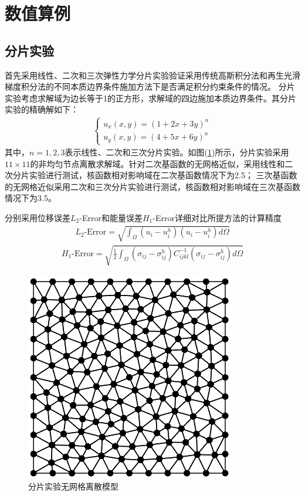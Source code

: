 \section{数值算例}
\subsection{分片实验}
首先采用线性、二次和三次弹性力学分片实验验证采用传统高斯积分法和再生光滑梯度积分法的不同本质边界条件施加方法下是否满足积分约束条件的情况。
分片实验考虑求解域为边长等于1的正方形，求解域的四边施加本质边界条件。其分片实验的精确解如下：
\begin{equation}
\begin{split}
    \begin{cases}
        u_x(x,y)=(1+2x+3y)^n\\
        u_y(x,y)=(4+5x+6y)^n
    \end{cases}
\end{split}
\end{equation}
其中，$n=1,2,3$表示线性、二次和三次分片实验。如图(\ref{patchtestmeshfree})所示，分片实验采用$11\times 11$的非均匀节点离散求解域。针对二次基函数的无网格近似，采用线性和二次分片实验进行测试，核函数相对影响域在二次基函数情况下为2.5；
三次基函数的无网格近似采用二次和三次分片实验进行测试，核函数相对影响域在三次基函数情况下为3.5。\par
分别采用位移误差$L_2$-Error和能量误差$H_1$-Error详细对比所提方法的计算精度
\begin{equation}
\begin{split}
    L_2\text{-Error}=\sqrt{\int_{\Omega}(u_i-u_i^h)(u_i-u_i^h)d\Omega}
\end{split}
\end{equation}
\begin{equation}
    \begin{split}
        H_1\text{-Error}=\sqrt{\frac{1}{2}\int_{\Omega}(\sigma_{ij}-\sigma_{ij}^h)C_{ijkl}^{-1}(\sigma_{ij}-\sigma_{ij}^h)d\Omega}
    \end{split}
    \end{equation}\par
\begin{figure}[H]
    \centering
    \includegraphics[scale=0.7]{figure/EHR/patchtestmeshfree.png}
    \caption{分片实验无网格离散模型}\label{patchtestmeshfree}
\end{figure} 
